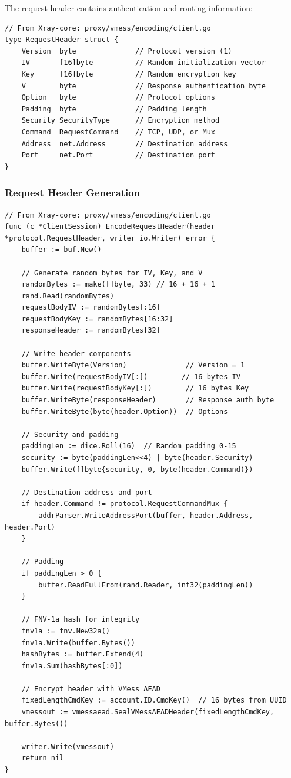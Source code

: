 The request header contains authentication and routing information:

\begin{verbatim}
// From Xray-core: proxy/vmess/encoding/client.go
type RequestHeader struct {
    Version  byte              // Protocol version (1)
    IV       [16]byte          // Random initialization vector
    Key      [16]byte          // Random encryption key
    V        byte              // Response authentication byte
    Option   byte              // Protocol options
    Padding  byte              // Padding length
    Security SecurityType      // Encryption method
    Command  RequestCommand    // TCP, UDP, or Mux
    Address  net.Address       // Destination address
    Port     net.Port          // Destination port
}
\end{verbatim}

\subsubsection{Request Header Generation}

\begin{verbatim}
// From Xray-core: proxy/vmess/encoding/client.go
func (c *ClientSession) EncodeRequestHeader(header *protocol.RequestHeader, writer io.Writer) error {
    buffer := buf.New()
    
    // Generate random bytes for IV, Key, and V
    randomBytes := make([]byte, 33) // 16 + 16 + 1
    rand.Read(randomBytes)
    requestBodyIV := randomBytes[:16]
    requestBodyKey := randomBytes[16:32]
    responseHeader := randomBytes[32]
    
    // Write header components
    buffer.WriteByte(Version)              // Version = 1
    buffer.Write(requestBodyIV[:])        // 16 bytes IV
    buffer.Write(requestBodyKey[:])        // 16 bytes Key
    buffer.WriteByte(responseHeader)       // Response auth byte
    buffer.WriteByte(byte(header.Option))  // Options
    
    // Security and padding
    paddingLen := dice.Roll(16)  // Random padding 0-15
    security := byte(paddingLen<<4) | byte(header.Security)
    buffer.Write([]byte{security, 0, byte(header.Command)})
    
    // Destination address and port
    if header.Command != protocol.RequestCommandMux {
        addrParser.WriteAddressPort(buffer, header.Address, header.Port)
    }
    
    // Padding
    if paddingLen > 0 {
        buffer.ReadFullFrom(rand.Reader, int32(paddingLen))
    }
    
    // FNV-1a hash for integrity
    fnv1a := fnv.New32a()
    fnv1a.Write(buffer.Bytes())
    hashBytes := buffer.Extend(4)
    fnv1a.Sum(hashBytes[:0])
    
    // Encrypt header with VMess AEAD
    fixedLengthCmdKey := account.ID.CmdKey()  // 16 bytes from UUID
    vmessout := vmessaead.SealVMessAEADHeader(fixedLengthCmdKey, buffer.Bytes())
    
    writer.Write(vmessout)
    return nil
}
\end{verbatim}

